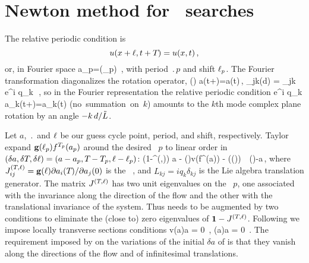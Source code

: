 

\section{Newton method  for \rpo\ searches}
\label{sec:NewtRPOs}


The relative periodic condition is
\[
    u(x+\ell,t+{T_{}})=u(x,t)
        \,,
\]
or, in Fourier space
\beq
    a_p=(\shift_p)  
\,,
    \label{eq:RPOcond}
\eeq
with period $\period{p}$ and shift $\ell_p$.
The Fourier transformation diagonalizes the rotation operator,
\beq
    (\shift)  a(t+\period{})=a(t)\,,\qquad
            _{jk}(d) = \delta_{jk} e^{i q_k\, \shift}\,,
    \label{eq:RPO}
\eeq
so in the Fourier representation the relative periodic condition
\beq
    e^{i q_k\, \shift}a_k(t+\period{})=a_k(t)  %
    \qquad \mbox{(no summation on $k$)}
    \label{eq:RPOcondition}
\eeq
amounts to the $k$th mode complex plane rotation by an
angle $-k\, d /\tilde{L}$.

Let
$a$, $\period{}$ and $\ell$
be our guess cycle point, period, and shift, respectively.
Taylor expand $\mathbf{g}(\ell_p)  {f^{{T_{p}}}(a_p)}$
around the desired \rpo\ $p$ to linear order in
$(\delta a,\delta {T_{}},\delta \ell)
   =(a-a_p,{T_{}} - {T_{p}},\ell-\ell_p)$:
\beq
    \left({1}-\jMps^{(\period{},\shift)}\right) \delta a
   - (\shift)v(f^{\period{}}(a)) \delta \period{}
                            - ((\shift))\delta \shift
                    \,\simeq\, (\shift)-a\,,
    \label{eq:NewtonBasicCond}
\eeq
where ${J}^{({T_{}},\ell)}_{ij}
  = \mathbf{g}(\ell)\partial a_i({T_{}})/\partial a_j(0)$
is the \rpo\ {\jacobianM}, and
$L_{kj}=i q_k \delta_{kj}$ is the Lie algebra translation
generator.
The matrix ${J}^{({T_{}},\ell)}$
has two unit eigenvalues on the \rpo\ $p$,
one associated with the invariance along
the direction of the flow and the other with the
translational invariance of the system. Thus 
needs to be augmented by two conditions to
eliminate the (close to) zero eigenvalues of
$\mathbf{1}-{J}^{({T_{}},\ell)}$. Following
 we impose locally transverse sections
conditions
\beq
    v(a)\cdot\delta a  =  0
    \,,\qquad
    (a)\cdot \delta a  =  0
\,.
\label{eq:NewtonAux}
\eeq
The requirement imposed by 
on the variations of the initial $\delta a$ of 
is that they   vanish along the directions of the flow
and of infinitesimal translations.

